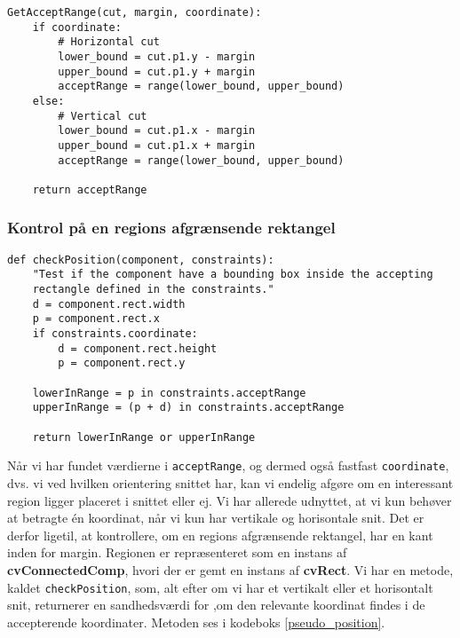 {\begin{lstlisting}[caption={Metode som genererer sættet af accepterende
    koordinater.},captionpos=b,label={pseudo_acceptRange},
    frame=tb, breaklines=false, float=b]
GetAcceptRange(cut, margin, coordinate):
    if coordinate:
        # Horizontal cut
        lower_bound = cut.p1.y - margin
        upper_bound = cut.p1.y + margin
        acceptRange = range(lower_bound, upper_bound)
    else:
        # Vertical cut
        lower_bound = cut.p1.x - margin
        upper_bound = cut.p1.x + margin
        acceptRange = range(lower_bound, upper_bound)

    return acceptRange
\end{lstlisting}

\subsubsection{Kontrol på en regions afgrænsende rektangel}
\begin{lstlisting}[caption={Metode, som kontrollerer, hvorvidt en region
    har en kant af det afgrænsende rektangel inden for margin.},
    captionpos=b, label={pseudo_position}, frame=tb, breaklines=false,
    float=t]
def checkPosition(component, constraints):
    "Test if the component have a bounding box inside the accepting
    rectangle defined in the constraints."
    d = component.rect.width
    p = component.rect.x
    if constraints.coordinate:
        d = component.rect.height
        p = component.rect.y

    lowerInRange = p in constraints.acceptRange
    upperInRange = (p + d) in constraints.acceptRange

    return lowerInRange or upperInRange
\end{lstlisting}
Når vi har fundet værdierne i \texttt{acceptRange}, og dermed også
fastfast \texttt{coordinate}, dvs. vi ved hvilken orientering snittet
har, kan vi endelig afgøre om en interessant region ligger placeret i
snittet eller ej. Vi har allerede udnyttet, at vi kun behøver at
betragte én koordinat, når vi kun har vertikale og horisontale snit. Det
er derfor ligetil, at kontrollere, om en regions afgrænsende rektangel,
har en kant inden for margin. Regionen er repræsenteret som en instans
af \textbf{cvConnectedComp}, hvori der er gemt en instans af
\textbf{cvRect}. Vi har en metode, kaldet \texttt{checkPosition}, som,
alt efter om vi har et vertikalt eller et horisontalt snit, returnerer
en sandhedsværdi for ,om den relevante koordinat findes i de accepterende
koordinater. Metoden ses i kodeboks \ref{pseudo_position}.

}
